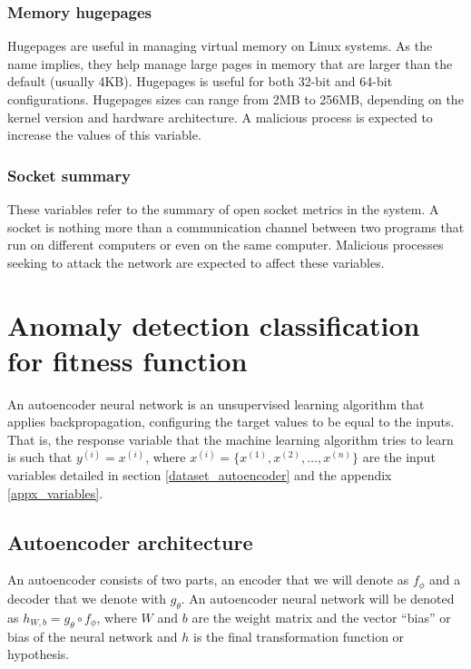\documentclass{iosart2c}
\begin{document}
\subsubsection{Memory hugepages}

Hugepages are useful in managing virtual memory on Linux systems. As the name implies, they help manage large pages in memory that are larger than the default (usually 4KB). Hugepages is useful for both 32-bit and 64-bit configurations. Hugepages sizes can range from 2MB to 256MB, depending on the kernel version and hardware architecture. A malicious process is expected to increase the values of this variable. \\



\subsubsection{Socket summary}
These variables refer to the summary of open socket metrics in the system. A socket is nothing more than a communication channel between two programs that run on different computers or even on the same computer. Malicious processes seeking to attack the network are expected to affect these variables.  \\

\section{Anomaly detection classification for fitness function}\label{autoencoder_section}

An autoencoder neural network is an unsupervised learning algorithm that applies backpropagation, configuring the target values to be equal to the inputs. That is, the response variable that the machine learning algorithm tries to learn is such that $y^{(i)} = x^{(i)} $, where $x^{(i)} = \{x^{(1)}, x^{(2)}, \ldots, x^{(n)} \} $ are the input variables detailed in section \ref{dataset_autoencoder} and the appendix \ref{appx_variables}.\\

\subsection{Autoencoder architecture}\label{autoencoder_architecture}

An autoencoder consists of two parts, an encoder that we will denote as $ f_{\phi} $ and a decoder that we denote with $ g_{\theta} $. An autoencoder neural network will be denoted as $ h_{W, b} = g_\theta \circ f_\phi$, where $W$ and $b$ are the weight matrix and the vector ``bias'' or bias of the neural network and $h$ is the final transformation function or hypothesis. \\
\end{document}
